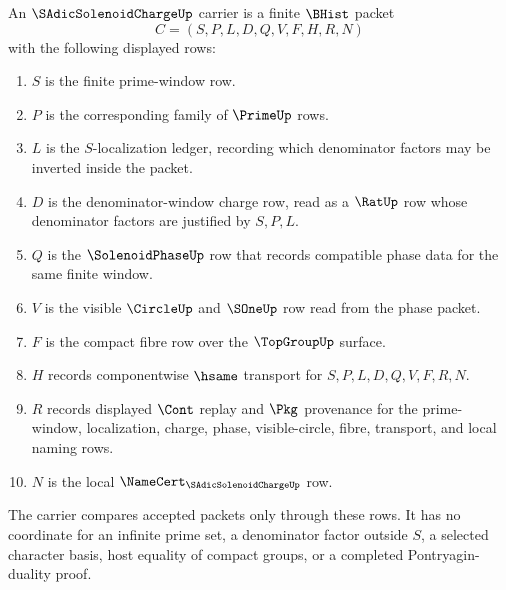 \begin{definition}
\label{def:s-adic-solenoid-charge-carrier}
An $\SAdicSolenoidChargeUp$ carrier is a finite $\BHist$ packet
$$
C=(S,P,L,D,Q,V,F,H,R,N)
$$
with the following displayed rows:
\begin{enumerate}
\item $S$ is the finite prime-window row.
\item $P$ is the corresponding family of $\PrimeUp$ rows.
\item $L$ is the $S$-localization ledger, recording which denominator factors may be inverted inside the packet.
\item $D$ is the denominator-window charge row, read as a $\RatUp$ row whose denominator factors are justified by $S,P,L$.
\item $Q$ is the $\SolenoidPhaseUp$ row that records compatible phase data for the same finite window.
\item $V$ is the visible $\CircleUp$ and $\SOneUp$ row read from the phase packet.
\item $F$ is the compact fibre row over the $\TopGroupUp$ surface.
\item $H$ records componentwise $\hsame$ transport for $S,P,L,D,Q,V,F,R,N$.
\item $R$ records displayed $\Cont$ replay and $\Pkg$ provenance for the prime-window, localization, charge, phase, visible-circle, fibre, transport, and local naming rows.
\item $N$ is the local $\NameCert_{\SAdicSolenoidChargeUp}$ row.
\end{enumerate}
The carrier compares accepted packets only through these rows. It has no coordinate for an infinite prime set, a denominator factor outside $S$, a selected character basis, host equality of compact groups, or a completed Pontryagin-duality proof.
\end{definition}

